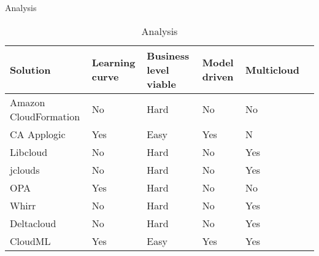 \begin{table}
    \caption{Analysis}
    \begin{tabular}{ | p{2cm} | p{2cm} | p{2.5cm} | p{2cm} | p{2cm} | p{2cm} |}
      \hline
      \textbf{Solution} & \textbf{Learning curve} & \textbf{Business level viable} & \textbf{Model driven} & \textbf{Multicloud} \\
      \hline
     Amazon CloudFormation & No & Hard & No & No \\ \hline
     CA Applogic & Yes & Easy & Yes & N  \\ \hline
     Libcloud & No & Hard & No & Yes \\ \hline
     jclouds & No & Hard & No & Yes \\ \hline
     OPA & Yes & Hard & No & No \\ \hline
     Whirr & No & Hard & No & Yes \\ \hline
     Deltacloud & No & Hard & No & Yes \\ \hline
     CloudML & Yes & Easy & Yes & Yes \\ \hline
  \end{tabular}
  \caption{Analysis}
  \label{table:analysis}
\end{table}

